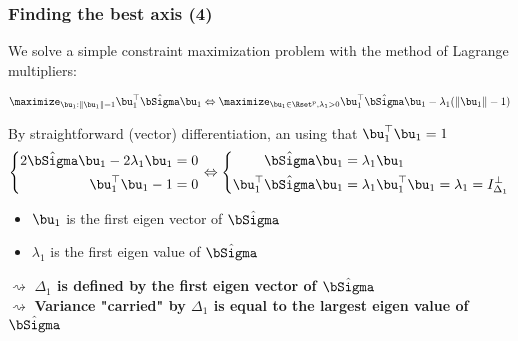 \begin{frame}
  \frametitle{Finding the best axis (4)}

  We solve a simple constraint maximization problem with the method of Lagrange multipliers:
  
  \begin{equation*}
    \maximize_{\bu_1: \|\bu_1\| = 1 } \bu_1^\top \hat\bSigma \bu_1 \Leftrightarrow \maximize_{\bu_1\in\Rset^p, \lambda_1 > 0} \bu_1^\top \hat\bSigma \bu_1 - \lambda_1 (\|\bu_1\| - 1)
  \end{equation*}
  
  By straightforward (vector) differentiation, an using that $\bu_1^\top \bu_1 = 1$
  \begin{equation*}
    \left\{\begin{aligned}
      2\hat\bSigma \bu_1 - 2\lambda_1 \bu_1 & = 0 \\  
      \bu_1^\top \bu_1 - 1 & = 0 \\  
    \end{aligned}\right. \Leftrightarrow
    \left\{\begin{aligned}
      \hat\bSigma \bu_1 & = \lambda_1 \bu_1  \\  
      \bu_1^\top \hat\bSigma \bu_1 & = \lambda_1 \bu_1^\top \bu_1 = \lambda_1 = I_{\Delta_1}^\bot \\  
    \end{aligned}\right.
  \end{equation*}
  
  \begin{itemize} 
     \item $\bu_1$ is the first eigen vector of $\hat{\bSigma}$
     \item $\lambda_1$ is the first eigen value of $\hat{\bSigma}$
   \end{itemize} 
  
  $\rightsquigarrow$ \alert{\bf $\Delta_1$ is defined by the first eigen vector of $\hat\bSigma$}\\
  $\rightsquigarrow$ \alert{\bf Variance "carried" by $\Delta_1$ is equal to the largest eigen value of $\hat\bSigma$}
  
\end{frame}

